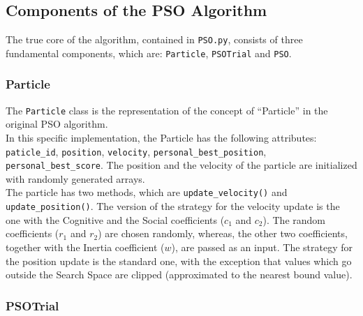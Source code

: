 \subsection{Components of the PSO Algorithm}

The true core of the algorithm, contained in \texttt{PSO.py}, consists of three fundamental components, which are: \texttt{Particle}, \texttt{PSOTrial} and \texttt{PSO}.

\subsubsection{Particle}

The \texttt{Particle} class is the representation of the concept of “Particle” in the original PSO algorithm.
% 
\\[0.3cm]In this specific implementation, the Particle has the following attributes: \texttt{paticle\_id}, \texttt{position}, \texttt{velocity}, \texttt{personal\_best\_position}, \texttt{personal\_best\_score}.
The position and the velocity of the particle are initialized with randomly generated arrays.
% 
\\[0.3cm]The particle has two methods, which are \texttt{update\_velocity()} and \texttt{update\_position()}. 
The version of the strategy for the velocity update is the one with the Cognitive and the Social coefficients ($c_1$ and $c_2$). The random coefficients ($r_1$ and $r_2$) are chosen randomly, whereas, the other two coefficients, together with the Inertia coefficient ($w$), are passed as an input.
The strategy for the position update is the standard one, with the exception that values which go outside the Search Space are clipped (approximated to the nearest bound value).

\subsubsection{PSOTrial}

